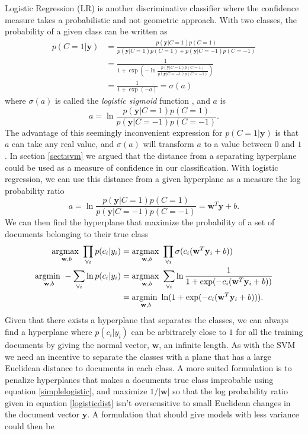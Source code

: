 Logistic Regression (LR) is another discriminative classifier where the confidence measure takes a probabilistic and not geometric approach. With two classes, the probability of a given class can be written as
\begin{align}
p(C = 1| \mathbf{y}) &= \frac{p(\mathbf{y}|C = 1)p(C = 1)}{p(\mathbf{y}|C=1)p(C=1)+p(\mathbf{y}|C=-1)p(C=-1)} \nonumber \\
&= \frac{1}{1+\exp(-\ln\frac{p(\mathbf{y}|C = 1)p(C=1)}{p(\mathbf{y}|C=-1)p(C=-1)})} \nonumber \\
&= \frac{1}{1+\exp(-a)} = \sigma(a) \label{logisticsigmoid}
\end{align}
where $\sigma(a)$ is called the \emph{logistic sigmoid} function \cite[p. 197]{machinelearningbook}, and $a$ is
\begin{equation}
\label{logistica}
a = \ln \frac{p(\mathbf{y}|C = 1)p(C=1)}{p(\mathbf{y}|C=-1)p(C=-1)}.
\end{equation}
The advantage of this seemingly inconvenient expression for $p(C=1 | \mathbf{y})$ is that $a$ can take any real value, and $\sigma(a)$ will transform $a$ to a value between $0$ and $1$. In section \ref{sect:svm} we argued that the distance from a separating hyperplane could be used as a measure of confidence in our classification.  With logistic regression, we can use this distance from a given hyperplane as a measure the log probability ratio \cite[p. 205]{machinelearningbook}
\begin{equation}
\label{logisticdist}
a = \ln \frac{p(\mathbf{y}|C=1)p(C=1)}{p(\mathbf{y}|C=-1)p(C=-1)} = \mathbf{w}^T\mathbf{y}+b.
\end{equation}
We can then find the hyperplane that maximize the probability of a set of documents belonging to their true class
\begin{align}
\underset{\mathbf{w}, b}{\operatorname{argmax\text{ }}} \prod_{\forall i} p(c_i | y_i)  &= 
\underset{\mathbf{w}, b}{\operatorname{argmax\text{ }}} \prod_{\forall i} \sigma(c_i(\mathbf{w}^T\mathbf{y}_i+b)) \nonumber \\
\underset{\mathbf{w}, b}{\operatorname{argmin\text{ }}} -\sum_{\forall i} \ln p(c_i | y_i) &= 
\underset{\mathbf{w}, b}{\operatorname{argmax\text{ }}} \sum_{\forall i} \ln \frac{1}{1+\exp(-c_i(\mathbf{w}^T\mathbf{y}_i+b))} \nonumber \\
&= \underset{\mathbf{w}, b}{\operatorname{argmin\text{ }}} \ln(1+\exp(-c_i(\mathbf{w}^T\mathbf{y}_i+b))). \label{simplelogistic}
\end{align}
Given that there exists a hyperplane that separates the classes, we can always find a hyperplane where $p(c_i | y_i)$ can be arbitrarely close to $1$ for all the training documents by giving the normal vector, $\mathbf{w}$, an infinite length. As with the SVM we need an incentive to separate the classes with a plane that has a large Euclidean distance to documents in each class. A more suited formulation is to penalize hyperplanes that makes a documents true class improbable using equation \ref{simplelogistic}, and maximize $1/|\mathbf{w}|$ so that the log probability ratio given in equation \ref{logisticdist} isn't oversensitive to small Euclidean changes in the document vector $\mathbf{y}$. A formulation that should give models with less variance could then be 
